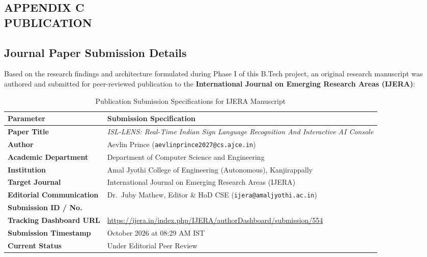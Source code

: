 \begin{spacing}{1.15}
\clearpage
\chapter*{APPENDIX C \\ PUBLICATION}
\pagestyle{plain}
\thispagestyle{plain}
\markboth{}{}
\renewcommand{\thefigure}{C.\arabic{figure}}
\setcounter{figure}{0}
\renewcommand{\thetable}{C.\arabic{table}}
\setcounter{table}{0}
\renewcommand{\theequation}{C.\arabic{equation}}
\setcounter{equation}{0}

\section*{Journal Paper Submission Details}

\noindent Based on the research findings and architecture formulated during Phase I of this B.Tech project, an original research manuscript was authored and submitted for peer-reviewed publication to the \textbf{International Journal on Emerging Research Areas (IJERA)}:

\begin{table}[H]
\centering
\caption{Publication Submission Specifications for IJERA Manuscript}
\label{tab:ijera_specifications}
\vspace{0.2cm}
\renewcommand{\arraystretch}{1.25}
\begin{tabular}{|>{\raggedright\arraybackslash}p{}|>{\raggedright\arraybackslash}p{}|}
\hline
\textbf{Parameter} & \textbf{Submission Specification} \\ \hline
\textbf{Paper Title} & \textit{ISL-LENS: Real-Time Indian Sign Language Recognition And Interactive AI Console} \\ \hline
\textbf{Author} & Aevlin Prince (\texttt{aevlinprince2027@cs.ajce.in}) \\ \hline
\textbf{Academic Department} & Department of Computer Science and Engineering \\ \hline
\textbf{Institution} & Amal Jyothi College of Engineering (Autonomous), Kanjirappally \\ \hline
\textbf{Target Journal} & International Journal on Emerging Research Areas (IJERA) \\ \hline
\textbf{Editorial Communication} & Dr.~Juby Mathew, Editor \& HoD CSE (\texttt{ijera@amaljyothi.ac.in}) \\ \hline
\textbf{Submission ID / No.} & 554 \\ \hline
\textbf{Tracking Dashboard URL} & \url{https://ijera.in/index.php/IJERA/authorDashboard/submission/554} \\ \hline
\textbf{Submission Timestamp} & 26 October 2026 at 08:29 AM IST \\ \hline
\textbf{Current Status} & Under Editorial Peer Review \\ \hline
\end{tabular}
\end{table}


\end{spacing}
